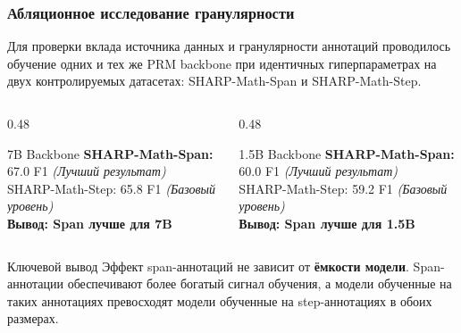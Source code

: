 \documentclass{beamer}
\begin{document}
\begin{frame}
  \frametitle{Абляционное исследование гранулярности}
  
  \small Для проверки вклада источника данных и гранулярности аннотаций проводилось обучение одних и тех же PRM backbone при идентичных гиперпараметрах на двух контролируемых датасетах: SHARP-Math-Span и SHARP-Math-Step.
  
  \vspace{0.5em}
  \begin{columns}[T]
      \begin{column}{0.48\textwidth}
          \begin{block}{7B Backbone}
              \textbf{SHARP-Math-Span:} 67.0 F1 \textit{(Лучший результат)} \\
              SHARP-Math-Step: 65.8 F1 \textit{(Базовый уровень)} \\
              \vspace{0.5em}
              \textbf{Вывод: Span лучше для 7B}
          \end{block}
      \end{column}
      
      \begin{column}{0.48\textwidth}
          \begin{block}{1.5B Backbone}
              \textbf{SHARP-Math-Span:} 60.0 F1 \textit{(Лучший результат)} \\
              SHARP-Math-Step: 59.2 F1 \textit{(Базовый уровень)} \\
              \vspace{0.5em}
              \textbf{Вывод: Span лучше для 1.5B}
          \end{block}
      \end{column}
  \end{columns}

  \vspace{0.5em}
  \begin{block}{Ключевой вывод}
      \footnotesize Эффект span-аннотаций не зависит от \textbf{ёмкости модели}. Span-аннотации обеспечивают более богатый сигнал обучения, а модели обученные на таких аннотациях превосходят модели обученные на step-аннотациях в обоих размерах.
  \end{block}
\end{frame}
\end{document}
